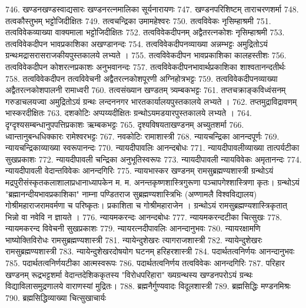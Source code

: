 746. खण्डनखण्डस्वाद्यसारः खण्डनरत्नमालिका	सूर्यनारायणः
747. खण्डनपरिशिष्टम् 						ताराचरणशर्मा
748. तत्वकौस्तुभम् 						भट्टोजिदीक्षितः
749. तत्वचन्द्रिका							उमामहेश्वरः
750. तत्वविवेकः							नृसिम्हाश्रमी
751. तत्वविवेकव्याख्या वाक्यमाला			भट्टोजिदीक्षितः
752. तत्वविवेकदीपनम् अद्वैतरत्नकोशः	नृसिम्हाश्रमी
753. तत्वविवेकदीपन भावप्रकाशिका		अखण्डानन्दः
754. तत्वविवेकदीपनव्याख्या 				अन्नम्भट्टः 
		अमुद्रितोऽयं ग्रन्थःमद्रासरासराजकीयपुस्तकालये लभ्यते । 
755. तत्वविवेकदीपन भावप्रकाशिका		कालहस्तीशः
756. तत्वविवेकदीपन कोशरत्नप्रकाशः 	अनुभवानन्दः
757. तत्वविवेकदीपनभावार्थप्रकाशिका		शाश्वतानन्दतीर्थः
758. तत्वविवेकदीपन तत्वविवेचनी अद्वैतरत्नकोशपूरणी अग्निहोत्रभट्टः
759. तत्वविवेकदीपनव्याख्या अद्वैतरत्नकोशपालनी रामाध्वरी
760. तत्वसंख्यान खण्डतम् 				त्र्यम्बकभट्टः
761. तप्तचक्राङ्कविध्वंसनम् 					गरुडाचलयज्वा
		अमुद्रितोऽयं ग्रन्थः लन्दननगर भारतकार्यालयपुस्तकालये लभ्यते ।
762. तप्तमुद्राविद्रावणम् 						भास्करदीक्षितः
763. दशकोटिः 								अप्पय्यदीक्षितः
		ग्रन्थोऽयमडयारपुस्तकालये लभ्यते । 
764.	दृग्दृश्यसम्बन्धानुपपत्तिप्रकाशः		ऋम्बकभट्टः
765. दृश्यविषयताखण्डनम् 				अच्युतशर्मा
766. ध्वान्तानुबन्धधिक्कारः				रामेश्वरभट्टः
767. नवकोटिः								रामाशास्त्री
768. न्यायचन्द्रिका							आनन्दपूर्णः
769. न्यायचन्द्रिकाव्याख्या					स्वरूपानन्दः
770. न्यायदीपावलिः						आनन्दबोधः
771. न्यायदीपावलीव्याख्या तात्पर्यटीका	सुखप्रकाशः
772. न्यायदीपावली चन्द्रिका				अनुभूतिस्वरूपः
773. न्यायदीपावली न्यायविवेकः			अमृतानन्दः
774. न्यायदीपावली वेदान्तविवेकः			आनन्दगिरिः
775. न्यायभास्कर खण्डनम्				रामसुब्रह्मण्यशास्त्री
		ग्रन्थोऽयं मद्रपुरीसंस्कृतकलाशालाप्रधानाध्यापकेन म. म. अनन्तकृष्णशास्त्रिगुरूणा पञ्चापगेश्शास्त्रिणा कृतः। ग्रन्थोऽयं "ब्रह्मानन्दीयभावप्रकाशिका" नाम्ना पण्डितराज सुब्रह्मण्यशास्त्रिभिः (अण्णामलै विश्वविद्यालय) गोश्रीमहाराजरामवर्मणा च परिष्कृतः। प्रकाशिता च गोश्रीमहाराजेन । ग्रन्थोऽयं रामसुब्रह्मण्यशास्त्रिकृतात् भिन्नो वा नवेवि न ज्ञायते । 
776. न्यायमकरन्दः							आनन्दबोधः 
777. न्यायमकरन्दटीका						चित्सुखः
778. न्यायमकरन्द विवेचनी				सुखप्रकाशः
779. न्यायरत्नदीपावलिः					आनन्दानुभवः	
780. न्यायरक्षामणि भाष्योक्तिविरोधः		रामसुब्रह्मण्यशास्त्री
781. न्यायेन्दुशेखरः							त्यागराजशास्त्री
782. न्यायेन्दुशेखरः							रामसुब्रह्मण्यशास्त्री
783. न्यायेन्दुशेखरदोषयोग घटनम्			हरिहरशास्त्री
784. पदार्थतत्वनिर्णयः						आनन्दानुभवः
785. पदार्थतत्वनिर्णयटीका					आत्मस्वरूपः
786. पदार्थतत्वनिर्णय तत्वविवेकः			आनन्दगिरिः
787. परिहार खण्डनम्						रूद्रभट्टशर्मा
		वेदान्तदेशिककृतस्य "विरोधपरिहारा" ख्यग्रन्थस्य खण्डनपरोऽयं ग्रन्थः विद्याविलासमुद्रणालये वाराणस्यां मुद्रितः। 
788. ब्रह्मनैर्गुण्यवादः							विदूलशास्त्री
789. ब्रह्मसिद्धिः								मण्डनमिश्रः
790. ब्रह्मसिद्धिव्याख्या						चित्सुखाचार्यः
